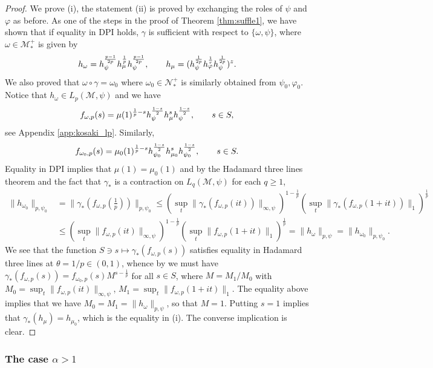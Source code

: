 \documentclass[12pt]{article}
\theoremstyle{definition}
\theoremstyle{remark}
\numberwithin{equation}{section}
\def\Me{\mathcal M}
\def\Ne{\mathcal N}
\def\ffi{\varphi}
\begin{document}
\begin{proof} We prove (i), the statement (ii) is proved by
exchanging the roles of $\psi$ and $\ffi$ as before. As one of the steps in the proof of
Theorem \ref{thm:suffle1}, we have shown that if equality in DPI holds,  $\gamma$ is
sufficient with respect to $\{\omega,\psi\}$, where $\omega\in \Me_*^+$ is given by
\[
h_\omega=h_\psi^{p-1\over 2p}h_\mu^{\frac1p}h_\psi^{p-1\over 2p},\qquad
h_\mu=(h_\psi^{1\over 2p}h_\ffi^{1\over r} h_\psi^{1\over 2p})^z.
\]
We also proved that $\omega\circ \gamma =\omega_0$ where $\omega_0\in \Ne_*^+$ is
similarly obtained from $\psi_0,\ffi_0$. Notice that $h_\omega\in L_p(\Me,\psi)$ and we
have
\[
f_{\omega,p}(s)=\mu(1)^{\frac1p-s} h_\psi^{1-s\over 2}h_\mu^sh_\psi^{1-s\over 2},\qquad
s\in S,
\]
see Appendix \ref{app:kosaki_lp}. Similarly,
\[
f_{\omega_0,p}(s)=\mu_0(1)^{\frac1p-s} h_{\psi_0}^{1-s\over 2}h_{\mu_0}^sh_{\psi_0}^{1-s\over 2},\qquad
s\in S.
\]
Equality in DPI implies that $\mu(1)=\mu_0(1)$ and by the Hadamard three lines theorem and
the fact that $\gamma_*$ is a contraction on $L_q(\Me,\psi)$ for each $q\ge 1$,
\begin{align*}
\|h_{\omega_0}\|_{p,\psi_0}&=\|\gamma_*(f_{\omega,p}(\frac1p))\|_{p,\psi_0}\le
\left(\sup_t \|\gamma_*(f_{\omega,p}(it))\|_{\infty,\psi}\right)^{1-\frac1p}\left(\sup_t
\|\gamma_*(f_{\omega,p}(1+it))\|_{1}\right)^{\frac1p}\\
&\le \left(\sup_t \|f_{\omega,p}(it)\|_{\infty,\psi}\right)^{1-\frac1p}\left(\sup_t
\|f_{\omega,p}(1+it)\|_{1}\right)^{\frac1p}=\|h_\omega\|_{p,\psi}=\|h_{\omega_0}\|_{p,\psi_0}.
\end{align*}
We see that the function $S\ni s\mapsto \gamma_*(f_{\omega,p}(s))$ satisfies equality in
Hadamard three lines at $\theta=1/p\in (0,1)$, whence by \cite[Thm.
2.10]{jencova2018renyi} we must have
$\gamma_*(f_{\omega,p}(s))=f_{\omega_0,p}(s)M^{s-\frac1p}$ for all $s\in S$,  where $M=M_1/M_0$ with
$M_0= \sup_t \|f_{\omega,p}(it)\|_{\infty,\psi}$, $M_1=\sup_t
\|f_{\omega,p}(1+it)\|_{1}$. The equality above implies that we have
$M_0=M_1=\|h_\omega\|_{p,\psi}$, so that $M=1$.
Putting $s=1$ implies that $\gamma_*(h_\mu)=h_{\mu_0}$, which is the equality in
(i).  
The converse implication is clear.
\end{proof}





\subsubsection{The case $\alpha>1$}
\end{document}
